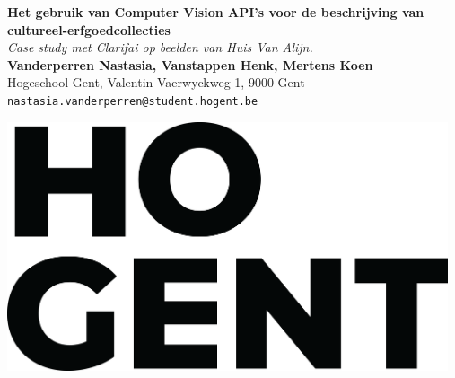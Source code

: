 \documentclass[a0,portrait]{a0poster}
\begin{document}


\begin{minipage}[t]{0.75\linewidth}
\VeryHuge \color{HoGentAccent1} \textbf{Het gebruik van Computer Vision API's voor de beschrijving van cultureel-erfgoedcollecties} \color{Black}\\ %
\Huge\textit{Case study met Clarifai op beelden van Huis Van Alijn.}\\[2.4cm] %
\huge \textbf{Vanderperren Nastasia, Vanstappen Henk, Mertens Koen}\\[0.5cm] %
\huge Hogeschool Gent, Valentin Vaerwyckweg 1, 9000 Gent\\[0.4cm] %
\Large \texttt{nastasia.vanderperren@student.hogent.be} \\
\end{minipage}
%
\begin{minipage}[t]{0.25\linewidth}
\includegraphics[width=13cm,right]{figures/HOGENT_Logo_Pos_rgb.png} 

\end{minipage}

\vspace{1cm} %

\end{document}
